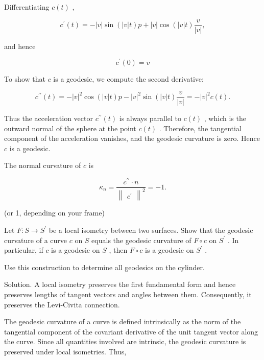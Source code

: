 \documentclass[10pt]{article}
\begin{document}
Differentiating \(c\left( t\right)\) ,

\[
{c}^{\prime }\left( t\right)  =  - \left| v\right| \sin \left( {\left| v\right| t}\right) p + \left| v\right| \cos \left( {\left| v\right| t}\right) \frac{v}{\left| v\right| },
\]

and hence

\[
{c}^{\prime }\left( 0\right)  = v
\]

To show that \(c\) is a geodesic, we compute the second derivative:

\[
{c}^{\prime \prime }\left( t\right)  =  - {\left| v\right| }^{2}\cos \left( {\left| v\right| t}\right) p - {\left| v\right| }^{2}\sin \left( {\left| v\right| t}\right) \frac{v}{\left| v\right| } =  - {\left| v\right| }^{2}c\left( t\right) .
\]

Thus the acceleration vector \({c}^{\prime \prime }\left( t\right)\) is always parallel to \(c\left( t\right)\) , which is the outward normal of the sphere at the point \(c\left( t\right)\) . Therefore, the tangential component of the acceleration vanishes, and the geodesic curvature is zero. Hence \(c\) is a geodesic.

The normal curvature of \(c\) is

\[
{\kappa }_{n} = \frac{{c}^{\prime \prime } \cdot  n}{{\begin{Vmatrix}{c}^{\prime }\end{Vmatrix}}^{2}} =  - 1.
\]

(or 1, depending on your frame)

\begin{problem}[title=PROBLEM 3 (6 POINTS)]
Let \(F : S \rightarrow  {S}^{\prime }\) be a local isometry between two surfaces. Show that the geodesic curvature of a curve \(c\) on \(S\) equals the geodesic curvature of \(F \circ  c\) on \({S}^{\prime }\) . In particular, if \(c\) is a geodesic on \(S\) , then \(F \circ  c\) is a geodesic on \({S}^{\prime }\) .

Use this construction to determine all geodesics on the cylinder.
\end{problem}

Solution. A local isometry preserves the first fundamental form and hence preserves lengths of tangent vectors and angles between them. Consequently, it preserves the Levi-Civita connection.

The geodesic curvature of a curve is defined intrinsically as the norm of the tangential component of the covariant derivative of the unit tangent vector along the curve. Since all quantities involved are intrinsic, the geodesic curvature is preserved under local isometries. Thus,
\end{document}

